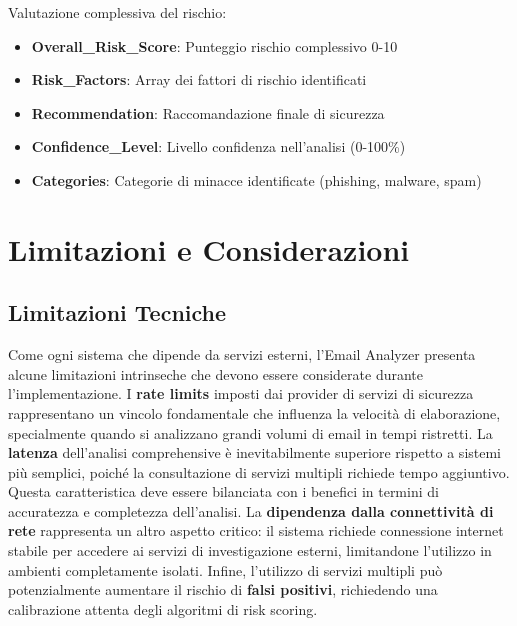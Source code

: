 \documentclass{article}
\begin{document}
Valutazione complessiva del rischio:

\begin{itemize}
    \item \textbf{Overall\_Risk\_Score}: Punteggio rischio complessivo 0-10
    \item \textbf{Risk\_Factors}: Array dei fattori di rischio identificati
    \item \textbf{Recommendation}: Raccomandazione finale di sicurezza
    \item \textbf{Confidence\_Level}: Livello confidenza nell'analisi (0-100\%)
    \item \textbf{Categories}: Categorie di minacce identificate (phishing, malware, spam)
\end{itemize}
\newpage

\section{Limitazioni e Considerazioni}

\subsection{Limitazioni Tecniche}

Come ogni sistema che dipende da servizi esterni, l'Email Analyzer presenta alcune limitazioni intrinseche che devono essere considerate durante l'implementazione. I \textbf{rate limits} imposti dai provider di servizi di sicurezza rappresentano un vincolo fondamentale che influenza la velocità di elaborazione, specialmente quando si analizzano grandi volumi di email in tempi ristretti.
\newline \newline
La \textbf{latenza} dell'analisi comprehensive è inevitabilmente superiore rispetto a sistemi più semplici, poiché la consultazione di servizi multipli richiede tempo aggiuntivo. Questa caratteristica deve essere bilanciata con i benefici in termini di accuratezza e completezza dell'analisi.
\newline \newline
La \textbf{dipendenza dalla connettività di rete} rappresenta un altro aspetto critico: il sistema richiede connessione internet stabile per accedere ai servizi di investigazione esterni, limitandone l'utilizzo in ambienti completamente isolati. Infine, l'utilizzo di servizi multipli può potenzialmente aumentare il rischio di \textbf{falsi positivi}, richiedendo una calibrazione attenta degli algoritmi di risk scoring.
\end{document}
